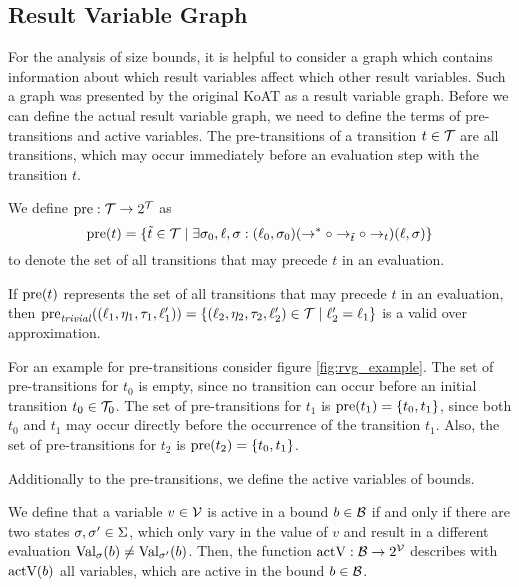 \subsection{Result Variable Graph}

For the analysis of size bounds, it is helpful to consider a graph which contains information about which result variables affect which other result variables.
Such a graph was presented by the original KoAT \cite{koat} as a result variable graph.
Before we can define the actual result variable graph, we need to define the terms of pre-transitions and active variables.
The pre-transitions of a transition $t \in \TSet$ are all transitions, which may occur immediately before an evaluation step with the transition $t$.

\begin{definition} 
  We define $\pre: \TSet \rightarrow 2^\TSet$ as
  \[\pre(t) = \braced{\tilde{t} \in \TSet \mid \exists \valuation_0, \location, \valuation: (\location_0, \valuation_0) (\rightarrow^* \circ \rightarrow_{\tilde{t}} \circ \rightarrow_{t}) (\location, \valuation)}\]
  to denote the set of all transitions that may precede $t$ in an evaluation.	
\end{definition}

If $\pre(t)$ represents the set of all transitions that may precede $t$ in an evaluation, then $\pre_{\mathit{trivial}}((\location_1, \update_1, \guard_1, \location_1')) = \braced{(\location_2, \update_2, \guard_2, \location_2') \in \TSet \mid \location_2' = \location_1}$ is a valid over approximation.



For an example for pre-transitions consider figure \ref{fig:rvg_example}.
The set of pre-transitions for $t_0$ is empty, since no transition can occur before an initial transition $t_0 \in \TSet_0$.
The set of pre-transitions for $t_1$ is $\pre(t_1) = \braced{t_0, t_1}$, since both $t_0$ and $t_1$ may occur directly before the occurrence of the transition $t_1$.
Also, the set of pre-transitions for $t_2$ is $\pre(t_2) = \braced{t_0, t_1}$.

Additionally to the pre-transitions, we define the active variables of bounds. 

\begin{definition} 
  We define that a variable $v \in \VSet$ is active in a bound $b \in \BoundSet$ if and only if there are two states $\valuation, \valuation' \in \Valuation$, which only vary in the value of $v$ and result in a different evaluation $\exacteval{b}{\valuation} \neq \exacteval{b}{\valuation'}$.
  Then, the function $\actV: \BoundSet \rightarrow 2^\VSet$ describes with $\actV(b)$ all variables, which are active in the bound $b \in \BoundSet$.
\end{definition}

